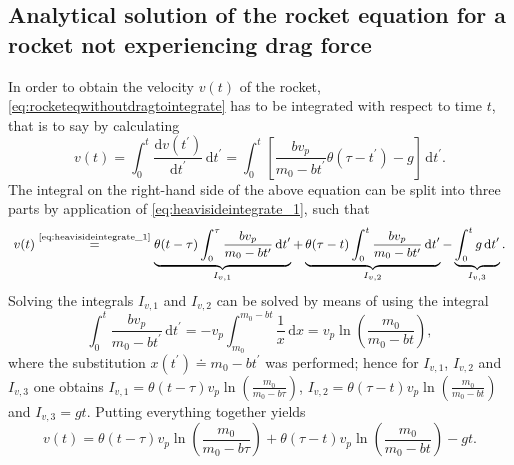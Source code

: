 \documentclass[a4paper,11pt]{report}
\begin{document}
\subsection{Analytical solution of the rocket equation for a rocket not experiencing drag force}
In order to obtain the velocity $v(t)$ of the rocket, \cref{eq:rocketeqwithoutdragtointegrate} has to be integrated with respect to time $t$, that is to say by calculating \begin{equation}
v(t) = \int_{0}^{t} \frac{\mathrm{d}v(t^\prime)}{\mathrm{d}t^\prime}\,\mathrm{d}t^\prime = \int_{0}^{t} \left[\frac{bv_p}{m_0-bt^\prime}\theta(\tau-t^\prime)-g\right]\,\mathrm{d}t^\prime.
\end{equation} The integral on the right-hand side of the above equation can be split into three parts by application of \cref{eq:heavisideintegrate_1}, such that \begin{gather}\small\begin{gathered}
v(t) \overset{\text{\cref{eq:heavisideintegrate_1}}}{=} \underbrace{\theta(t-\tau)\int_{0}^{\tau} \frac{bv_p}{m_0-bt^\prime}\,\mathrm{d}t^\prime}_{I_{v,1}} + \underbrace{\theta(\tau-t)\int_{0}^{t}\frac{bv_p}{m_0-bt^\prime}\,\mathrm{d}t^\prime}_{I_{v,2}} - \underbrace{\int_{0}^{t}g\,\mathrm{d}t^\prime}_{I_{v,3}}.
\end{gathered}\end{gather} Solving the integrals $I_{v,1}$ and $I_{v,2}$ can be solved by means of using the integral \begin{equation}
\int_{0}^{t}\frac{bv_p}{m_0-bt^\prime}\,\mathrm{d}t^\prime = -v_p\int_{m_0}^{m_0-bt} \frac{1}{x}\,\mathrm{d}x = v_p \ln\left(\frac{m_0}{m_0-bt}\right),
\end{equation} where the substitution $x(t^\prime) \doteq m_0-bt^\prime$ was performed; hence for $I_{v,1}$, $I_{v,2}$ and $I_{v,3}$ one obtains 
$I_{v,1} = \theta(t-\tau)v_p\ln\left(\frac{m_0}{m_0-b\tau}\right)$, $I_{v,2} = \theta(\tau-t)v_p\ln\left(\frac{m_0}{m_0-bt}\right)$ and $I_{v,3} = gt$. Putting everything together yields \begin{equation}\label{eq:rocketvelocitywithoutdrag}
v(t) = \theta(t-\tau)v_p\ln\left(\frac{m_0}{m_0-b\tau}\right) + \theta(\tau-t)v_p\ln\left(\frac{m_0}{m_0-bt}\right) - gt.
\end{equation}
\end{document}

